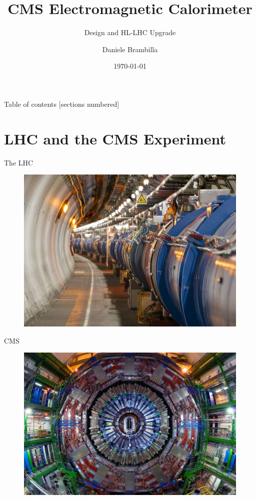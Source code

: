 \documentclass[10pt]{beamer}
\title{CMS Electromagnetic Calorimeter}
\subtitle{Design and HL-LHC Upgrade}
\date{\today}
\author{Daniele Brambilla}
\institute{University of Milano Bicocca}
\begin{document}
\maketitle    


\begin{frame}{Table of contents}
  [sections numbered]
  \tableofcontents%
\end{frame}

\section[LHC and the CMS experiment]{LHC and the CMS Experiment}

\begin{frame}[fragile]{The LHC}
    \begin{figure}
        \centering
        \includegraphics[width=.95\textwidth]{./img/CERN_LHC_tunnel.jpg}
    \end{figure}
\end{frame}

\begin{frame}[fragile]{CMS}
  \begin{figure}
        \centering
        \includegraphics[width=.95\textwidth]{./img/CMS_front.jpg}
    \end{figure}
\end{frame}
\end{document}
